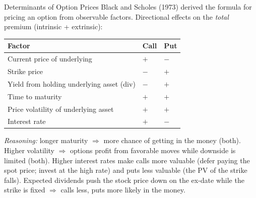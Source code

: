 \documentclass[aspectratio=169]{beamer}
\begin{document}
\begin{frame}{Determinants of Option Prices}
Black and Scholes (1973) derived the formula for pricing an option from observable factors. Directional effects on the \emph{total} premium (intrinsic + extrinsic):
\begin{center}
\small
\begin{tabular}{p{}p{}p{}}
\toprule
\textbf{Factor} & \textbf{Call} & \textbf{Put} \\
\midrule
Current price of underlying & $+$ & $-$ \\
Strike price & $-$ & $+$ \\
Yield from holding underlying asset (div) & $-$ & $+$ \\
Time to maturity & $+$ & $+$ \\
Price volatility of underlying asset & $+$ & $+$ \\
Interest rate & $+$ & $-$ \\
\bottomrule
\end{tabular}
\end{center}
\vspace{0.1em}
\emph{Reasoning:} longer maturity $\Rightarrow$ more chance of getting in the money (both). Higher volatility $\Rightarrow$ options profit from favorable moves while downside is limited (both). Higher interest rates make calls more valuable (defer paying the spot price; invest at the high rate) and puts less valuable (the PV of the strike falls). Expected dividends push the stock price down on the ex-date while the strike is fixed $\Rightarrow$ calls less, puts more likely in the money.
\end{frame}
\end{document}
